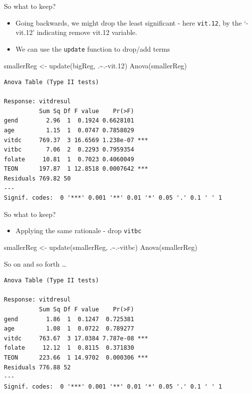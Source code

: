 \documentclass[
  oneside]{krantz}
\newenvironment{Shaded}{\begin{snugshade}}{\end{snugshade}}
\newcommand{\FloatTok}[1]{\textcolor[rgb]{0.00,0.00,0.81}{#1}}
\newcommand{\FunctionTok}[1]{\textcolor[rgb]{0.00,0.00,0.00}{#1}}
\newcommand{\NormalTok}[1]{#1}
\newcommand{\OtherTok}[1]{\textcolor[rgb]{0.56,0.35,0.01}{#1}}
\newcommand{\SpecialCharTok}[1]{\textcolor[rgb]{0.00,0.00,0.00}{#1}}
\providecommand{\tightlist}{%
  \setlength{\itemsep}{0pt}\setlength{\parskip}{0pt}}
\begin{document}
So what to keep?

\begin{itemize}
\tightlist
\item
  Going backwards, we might drop the least significant - here \texttt{vit.12}, by the `-vit.12' indicating remove vit.12 variable.
\item
  We can use the \texttt{update} function to drop/add terms
\end{itemize}

\begin{Shaded}
\begin{Highlighting}[]
\NormalTok{smallerReg }\OtherTok{\textless{}{-}} \FunctionTok{update}\NormalTok{(bigReg, .}\SpecialCharTok{\textasciitilde{}}\NormalTok{.}\SpecialCharTok{{-}}\NormalTok{vit}\FloatTok{.12}\NormalTok{)}
\FunctionTok{Anova}\NormalTok{(smallerReg)}
\end{Highlighting}
\end{Shaded}

\begin{verbatim}
Anova Table (Type II tests)

Response: vitdresul
          Sum Sq Df F value    Pr(>F)    
gend        2.96  1  0.1924 0.6628101    
age         1.15  1  0.0747 0.7858029    
vitdc     769.37  3 16.6569 1.238e-07 ***
vitbc       7.06  2  0.2293 0.7959354    
folate     10.81  1  0.7023 0.4060049    
TEON      197.87  1 12.8518 0.0007642 ***
Residuals 769.82 50                      
---
Signif. codes:  0 '***' 0.001 '**' 0.01 '*' 0.05 '.' 0.1 ' ' 1
\end{verbatim}

So what to keep?

\begin{itemize}
\tightlist
\item
  Applying the same rationale - drop \texttt{vitbc}
\end{itemize}

\begin{Shaded}
\begin{Highlighting}[]
\NormalTok{smallerReg }\OtherTok{\textless{}{-}} \FunctionTok{update}\NormalTok{(smallerReg, .}\SpecialCharTok{\textasciitilde{}}\NormalTok{.}\SpecialCharTok{{-}}\NormalTok{vitbc)}
\FunctionTok{Anova}\NormalTok{(smallerReg)}
\end{Highlighting}
\end{Shaded}

So on and so forth \ldots{}

\begin{verbatim}
Anova Table (Type II tests)

Response: vitdresul
          Sum Sq Df F value    Pr(>F)    
gend        1.86  1  0.1247  0.725381    
age         1.08  1  0.0722  0.789277    
vitdc     763.67  3 17.0384 7.787e-08 ***
folate     12.12  1  0.8115  0.371830    
TEON      223.66  1 14.9702  0.000306 ***
Residuals 776.88 52                      
---
Signif. codes:  0 '***' 0.001 '**' 0.01 '*' 0.05 '.' 0.1 ' ' 1
\end{verbatim}
\end{document}
